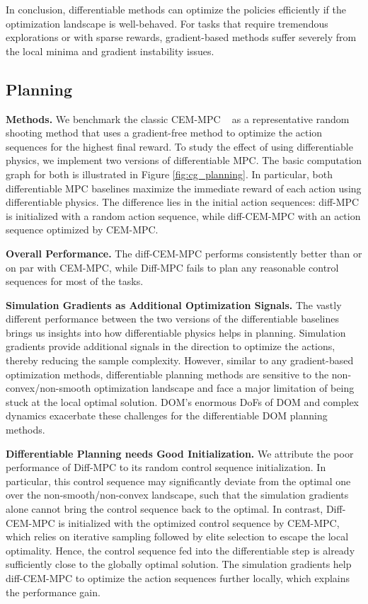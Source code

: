 

In conclusion, differentiable methods can optimize the policies efficiently if the optimization landscape is well-behaved. For tasks that require tremendous explorations or with sparse rewards, gradient-based methods suffer severely from the local minima and gradient instability issues. 

\subsection{Planning}
\textbf{Methods.}
We benchmark the classic CEM-MPC ~\citep{Richards2005RobustCM} as a representative random shooting method that uses a gradient-free method to optimize the action sequences for the highest final reward. To study the effect of using differentiable physics, we implement two versions of differentiable MPC. The basic computation graph for both is illustrated in Figure \ref{fig:cg_planning}. In particular, both differentiable MPC baselines maximize the immediate reward of each action using differentiable physics. The difference lies in the initial action sequences: diff-MPC is initialized with a random action sequence, while diff-CEM-MPC with an action sequence optimized by CEM-MPC.

\textbf{Overall Performance.} The diff-CEM-MPC performs consistently better than or on par with CEM-MPC, while Diff-MPC fails to plan any reasonable control sequences for most of the tasks. 

\textbf{Simulation Gradients as Additional Optimization Signals.} The vastly different performance between the two versions of the differentiable baselines brings us insights into how differentiable physics helps in planning. Simulation gradients provide additional signals in the direction to optimize the actions, thereby reducing the sample complexity. However, similar to any gradient-based optimization methods, differentiable planning methods are sensitive to the non-convex/non-smooth optimization landscape and face a major limitation of being stuck at the local optimal solution. DOM's enormous DoFs of DOM and complex dynamics exacerbate these challenges for the differentiable DOM planning methods. 

\textbf{Differentiable Planning needs Good Initialization.} We attribute the poor performance of Diff-MPC to its random control sequence initialization. In particular,  this control sequence may significantly deviate from the optimal one over the non-smooth/non-convex landscape, such that the simulation gradients alone cannot bring the control sequence back to the optimal. In contrast, Diff-CEM-MPC is initialized with the optimized control sequence by CEM-MPC, which relies on iterative sampling followed by elite selection to escape the local optimality. Hence, the control sequence fed into the differentiable step is already sufficiently close to the globally optimal solution. The simulation gradients help diff-CEM-MPC to optimize the action sequences further locally, which explains the performance gain. 

